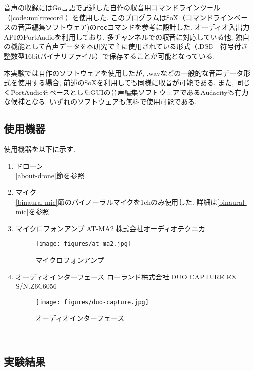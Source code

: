 音声の収録にはGo言語で記述した自作の収音用コマンドラインツール（\ref{code:multirecord}）を使用した. 
このプログラムはSoX（コマンドラインベースの音声編集ソフトウェア)\cite{sox:online}の\texttt{rec}コマンドを参考に設計した. 
オーディオ入出力APIのPortAudio\cite{portaudio:online}を利用しており, 多チャンネルでの収音に対応している他, 独自の機能として音声データを本研究で主に使用されている形式（.DSB - 符号付き整数型16bitバイナリファイル）で保存することが可能となっている. 

本実験では自作のソフトウェアを使用したが, .wavなどの一般的な音声データ形式を使用する場合, 前述のSoXを利用しても同様に収音が可能である. また, 同じくPortAudioをベースとしたGUIの音声編集ソフトウェアであるAudacity\cite{audacity:online}も有力な候補となる. いずれのソフトウェアも無料で使用可能である. 

\subsection{使用機器}\label{used-equipments-drone}

使用機器を以下に示す. 

\begin{enumerate}
\renewcommand{\labelenumi}{(\arabic{enumi})}
\item
  ドローン\\
  \ref{about-drone}節を参照. 
\item
  マイク \\
  \ref{binaural-mic}節のバイノーラルマイクを1chのみ使用した. 詳細は\ref{binaural-mic}を参照. 
\item
  マイクロフォンアンプ AT-MA2 株式会社オーディオテクニカ
  \begin{figure}[H]
  \centering
  \texttt{[image: figures/at-ma2.jpg]}
  \caption{マイクロフォンアンプ}
  \label{fig:at-ma2}
  \end{figure}

\item
  オーディオインターフェース ローランド株式会社 DUO-CAPTURE EX S/N.Z6C6056
  \cite{audio_interface:online}
  \begin{figure}[H]
  \centering
  \texttt{[image: figures/duo-capture.jpg]}
  \caption{オーディオインターフェース}
  \label{fig:duo-capture}
  \end{figure}
\end{enumerate}

\
\subsection{実験結果}\label{result-drone}

